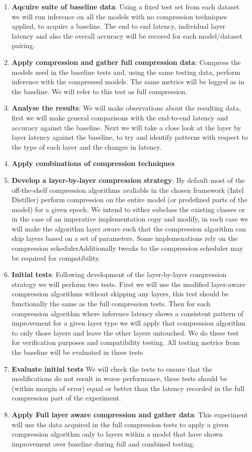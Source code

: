 \documentclass[../../D1.tex]{subfiles}
\begin{document}
\begin{enumerate}
    \item \textbf{Aqcuire suite of baseline data}: Using a fixed test set from each dataset we will run inference on all the models with no compression techniques applied, to acquire a baseline. The end to end latency, individual layer latency and also the overall accuracy will be recored for each model/dataset pairing.
    \item \textbf{Apply compression and gather full compression data}: Compress the models used in the baseline tests and, using the same testing data, perform inference with the compressed models. The same metrics will be logged as in the baseline. We will refer to this test as full compression.
    \item \textbf{Analyse the results}: We will make observations about the resulting data, first we will make general comparisons with the end-to-end latency and accuracy against the baseline. Next we will take a close look at the layer by layer latency against the baseline, to try and identify patterns with respect to the type of each layer and the changes in latency.
    \item \textbf{Apply combinations of compression techniques}
    \item \textbf{Develop a layer-by-layer compression strategy}: By default most of the off-the-shelf compression algorithms avaliable in the chosen framework (Intel Distiller) perform compression on the entire model (or predefined parts of the model) for a given epoch. We intend to either subclass the existing classes or in the case of an imperative implementation copy and modify, in each case we will make the algorithm layer aware such that the compression algorithm can skip layers based on a set of parameters. Some implemenations rely on the compression schedulerAdditionally tweaks to the compression scheduler may be required for compatibility.
    \item \textbf{Initial tests}: Following development of the layer-by-layer compression strategy we will perform two tests. First we will use the modified layer-aware compression algorithms without skipping any layers, this test should be functionally the same as the full compression tests. Then for each compression algorithm where inference latency shows a consistent pattern of improvement for a given layer type we will apply that compression algorithm to only those layers and leave the other layers untouched. We do these test for verification purposes and compatibility testing. All testing metrics from the baseline will be evaluated in these tests
    \item \textbf{Evaluate initial tests} We will check the tests to ensure that the modifications do not result in worse performance, these tests should be (within margin of error) equal or better than the latency recorded in the full compression part of the experiment.
    \item \textbf{Apply Full layer aware compression and gather data}: This experiment will use the data acquired in the full compression tests to apply a given compression algorithm only to layers within a model that have shown improvement over baseline during full and combined testing.
\end{enumerate}
\end{document}
